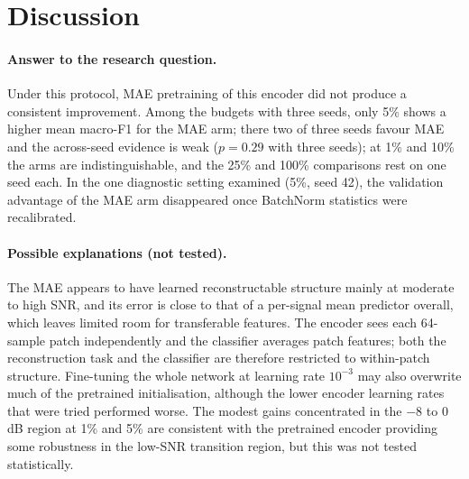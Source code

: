 \documentclass[11pt,a4paper]{article}
\begin{document}
\section{Discussion}
\paragraph{Answer to the research question.} Under this protocol, MAE pretraining of this encoder did not produce a consistent improvement. Among the budgets with three seeds, only 5\% shows a higher mean macro-F1 for the MAE arm; there two of three seeds favour MAE and the across-seed evidence is weak ($p=0.29$ with three seeds); at 1\% and 10\% the arms are indistinguishable, and the 25\% and 100\% comparisons rest on one seed each. In the one diagnostic setting examined (5\%, seed 42), the validation advantage of the MAE arm disappeared once BatchNorm statistics were recalibrated.

\paragraph{Possible explanations (not tested).} The MAE appears to have learned reconstructable structure mainly at moderate to high SNR, and its error is close to that of a per-signal mean predictor overall, which leaves limited room for transferable features. The encoder sees each 64-sample patch independently and the classifier averages patch features; both the reconstruction task and the classifier are therefore restricted to within-patch structure. Fine-tuning the whole network at learning rate $10^{-3}$ may also overwrite much of the pretrained initialisation, although the lower encoder learning rates that were tried performed worse. The modest gains concentrated in the $-8$ to $0$\,dB region at 1\% and 5\% are consistent with the pretrained encoder providing some robustness in the low-SNR transition region, but this was not tested statistically.
\end{document}
